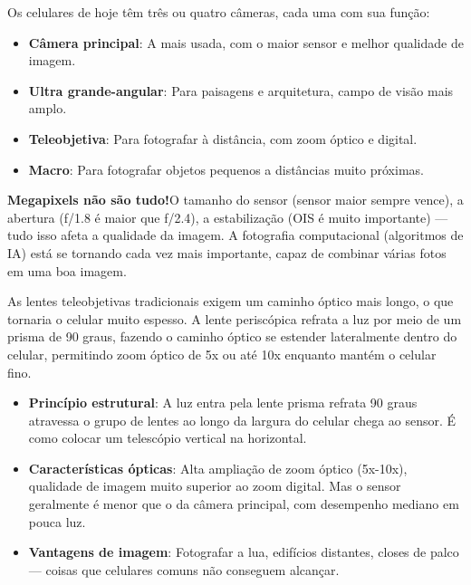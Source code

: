 Os celulares de hoje têm três ou quatro câmeras, cada uma com sua função:

\begin{itemize}
  \item \textbf{Câmera principal}: A mais usada, com o maior sensor e melhor qualidade de imagem.
  \item \textbf{Ultra grande-angular}: Para paisagens e arquitetura, campo de visão mais amplo.
  \item \textbf{Teleobjetiva}: Para fotografar à distância, com zoom óptico e digital.
  \item \textbf{Macro}: Para fotografar objetos pequenos a distâncias muito próximas.
\end{itemize}

\textbf{Megapixels não são tudo!}O tamanho do sensor (sensor maior sempre vence), a abertura (f/1.8 é maior que f/2.4), a estabilização (OIS é muito importante) — tudo isso afeta a qualidade da imagem. A fotografia computacional (algoritmos de IA) está se tornando cada vez mais importante, capaz de combinar várias fotos em uma boa imagem.


As lentes teleobjetivas tradicionais exigem um caminho óptico mais longo, o que tornaria o celular muito espesso. A lente periscópica refrata a luz por meio de um prisma de 90 graus, fazendo o caminho óptico se estender lateralmente dentro do celular, permitindo zoom óptico de 5x ou até 10x enquanto mantém o celular fino.

\begin{itemize}
  \item \textbf{Princípio estrutural}: A luz entra pela lente prisma refrata 90 graus atravessa o grupo de lentes ao longo da largura do celular chega ao sensor. É como colocar um telescópio vertical na horizontal.
  \item \textbf{Características ópticas}: Alta ampliação de zoom óptico (5x-10x), qualidade de imagem muito superior ao zoom digital. Mas o sensor geralmente é menor que o da câmera principal, com desempenho mediano em pouca luz.
  \item \textbf{Vantagens de imagem}: Fotografar a lua, edifícios distantes, closes de palco — coisas que celulares comuns não conseguem alcançar.
\end{itemize}


